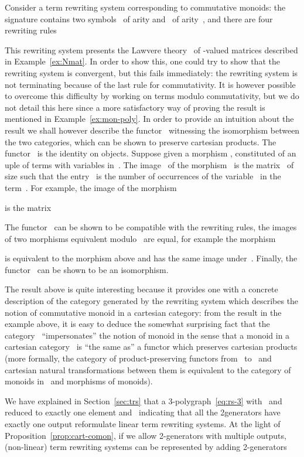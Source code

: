\documentclass{LMCS}
\begin{document}
\begin{exa}
  \label{ex:mon-trs}
  Consider a term rewriting system corresponding to commutative monoids: the
  signature contains two symbols~ of arity  and~ of arity~, and
  there are four rewriting rules
  
  This rewriting system presents the Lawvere theory~ of -valued
  matrices described in Example~\ref{ex:Nmat}. In order to show this, one could
  try to show that the rewriting system is convergent, but this fails
  immediately: the rewriting system is not terminating because of the last rule
  for commutativity. It is however possible to overcome this difficulty by
  working on terms modulo commutativity, but we do not detail this here since a
  more satisfactory way of proving the result is mentioned in
  Example~\ref{ex:mon-poly}.
In order to provide an intuition about the result we shall however describe
  the functor~ witnessing the isomorphism
  between the two categories, which can be shown to preserve cartesian
  products. The functor~ is the identity on objects. Suppose given a morphism
  , constituted of an \nbd{}uple of terms  with
  variables in~. The image~ of the morphism~ is the matrix~ of
  size  such that the entry~ is the number of occurrences of
  the variable~ in the term~. For example, the image of the morphism
  
  is the matrix
  
  The functor~ can be shown to be compatible with the rewriting rules, \ie
  the images of two morphisms equivalent modulo~ are equal, for
  example the morphism
  
  is equivalent to the morphism above and has the same image under~. Finally,
  the functor~ can be shown to be an isomorphism.
\end{exa}

The result above is quite interesting because it provides one with a concrete
description of the category generated by the rewriting system which describes
the notion of commutative monoid in a cartesian category: from the result in the
example above, it is easy to deduce the somewhat surprising fact that the
category~ ``impersonates'' the notion of monoid in the sense that a
monoid in a cartesian category~ is ``the same as'' a functor 
which preserves cartesian products (more formally, the category of
product-preserving functors from~ to~ and cartesian natural
transformations between them is equivalent to the category of monoids in~
and morphisms of monoids).

We have explained in Section~\ref{sec:trs} that a 3-polygraph~\eqref{eq:rs-3}
with~ and \hbox{} reduced to exactly one element and~
indicating that all the 2\nbd{}generators have exactly one output reformulate
linear term rewriting systems. At the light of Proposition~\ref{prop:cart-comon},
if we allow 2-generators with multiple outputs, (non-linear) term rewriting
systems can be represented by adding 2-generators
\end{document}

